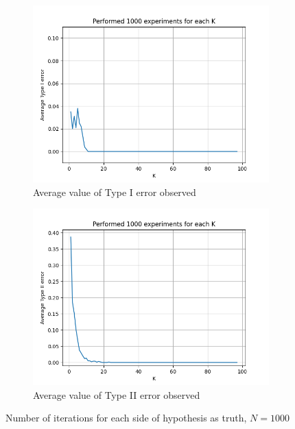 \documentclass[fleqn, 11pt]{article}
\begin{document}
\vspace{30pt}
\begin{figure}[H]
    \centering
    \begin{subfigure}[H]{0.49\textwidth}
        \centering
        \includegraphics[width=\textwidth]{P4/type1_1000.png}
        \caption[]{Average value of Type I error observed}
    \end{subfigure}
    \begin{subfigure}[H]{0.49\textwidth}
        \centering
        \includegraphics[width=\textwidth]{P4/type2_1000.png}
        \caption[]{Average value of Type II error observed}
    \end{subfigure}
    \caption{Number of iterations for each side of hypothesis as truth, $N = 1000$}
\end{figure}
\end{document}
